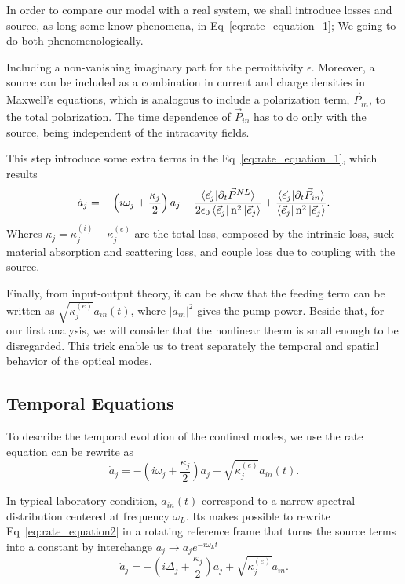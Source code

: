In order to compare our model with a real system, we shall introduce losses and source, as long some know phenomena, in Eq~\ref{eq:rate_equation_1}; We going to do both phenomenologically.

Including a non-vanishing imaginary part for the permittivity $\epsilon$. Moreover, a source can be included as a combination in current and charge densities in Maxwell's equations, which is analogous to include a polarization term, $\vec{P}_{in}$, to the total polarization. The time dependence of $\vec{P}_{in}$ has to do only with the source, being independent of the intracavity fields.

This step introduce some extra terms in the Eq~\ref{eq:rate_equation_1}, which results
\begin{equation}
    \dot{a}_j = -\left(i\omega_j +\frac{\kappa_j}{2}\right)a_j -\frac{\braket{\vec{e}_j|\partial_t\vec{P}^{NL}}}{2\epsilon_0\bra{\vec{e}_j}\text{n}^2\ket{\vec{e}_j}}+\frac{\braket{\vec{e}_j|\partial_t\vec{P}_{in}}}{\bra{\vec{e}_j}\text{n}^2\ket{\vec{e}_j}}.
\end{equation}
Wheres $\kappa_j = \kappa^{(i)}_j+\kappa^{(e)}_j$ are the total loss, composed by the intrinsic loss, suck material absorption and scattering loss, and couple loss due to coupling with the source. 

Finally, from input-output theory, it can be show that the feeding term can be written as $\sqrt{\kappa^{(e)}_j}a_{in}(t)$, where $|a_{in}|^2$ gives the pump power. Beside that, for our first analysis, we will consider that the nonlinear therm is small enough to be disregarded. This trick enable us to treat separately the temporal and spatial behavior of the optical modes. 

\subsection{Temporal Equations}

To describe the temporal evolution of the confined modes, we use the rate equation can be rewrite as 
\begin{equation}
    \dot{a}_j = -\left(i\omega_j +\frac{\kappa_j}{2}\right)a_j +\sqrt{\kappa^{(e)}_j}a_{in}(t).
    \label{eq:rate_equation2}
\end{equation} 

In typical laboratory condition, $a_{in}(t)$ correspond to a narrow spectral distribution centered at frequency $\omega_L$. Its makes possible to rewrite Eq~\ref{eq:rate_equation2} in a rotating reference frame that turns the source terms into a constant by interchange $a_j \rightarrow a_je^{-i\omega_Lt}$
\begin{equation}
    \dot{a}_j = -\left(i\Delta_j +\frac{\kappa_j}{2}\right)a_j +\sqrt{\kappa^{(e)}_j}a_{in}.
    \label{eq:rate_equation_unperturbed}
\end{equation}



